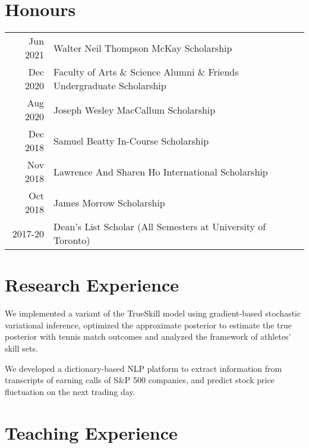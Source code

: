 \documentclass[letterpaper]{deedy-resume} %
\begin{document}
\begin{minipage}[t]{0.66\textwidth}
\section{Honours} 

\begin{tabular}{rll}
Jun 2021	 & Walter Neil Thompson McKay Scholarship \\
Dec 2020	 & Faculty of Arts \& Science Alumni \& Friends Undergraduate Scholarship \\
Aug 2020	 & Joseph Wesley MacCallum Scholarship \\
Dec 2018	 & Samuel Beatty In-Course Scholarship \\
Nov 2018	 & Lawrence And Sharen Ho International Scholarship\\
Oct 2018	 & James Morrow Scholarship \\
2017-20		 & Dean's List Scholar (All Semesters at University of Toronto)
\end{tabular}

\sectionspace %



\section{Research Experience}
\small{We implemented a variant of the TrueSkill model using gradient-based stochastic variational inference, optimized the approximate posterior to estimate the true posterior with tennis match outcomes and analyzed the framework of athletes' skill sets.}

\sectionspace

\small {We developed a dictionary-based NLP platform to extract information from transcripts of earning calls of S\&P 500 companies, and predict stock price fluctuation on the next trading day.}

\sectionspace %


\section{Teaching Experience}


\end{minipage}
\end{document}
